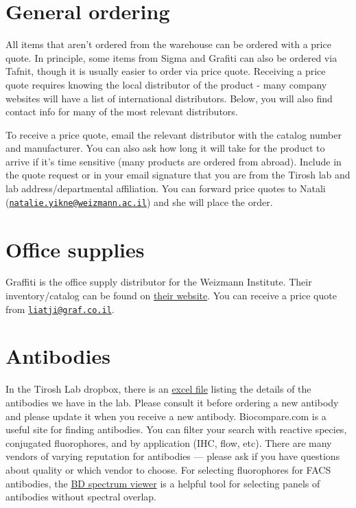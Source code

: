 \documentclass[]{book}
\begin{document}
\section{General ordering}\label{general-ordering}

All items that aren't ordered from the warehouse can be ordered with a
price quote. In principle, some items from Sigma and Grafiti can also be
ordered via Tafnit, though it is usually easier to order via price
quote. Receiving a price quote requires knowing the local distributor of
the product - many company websites will have a list of international
distributors. Below, you will also find contact info for many of the
most relevant distributors.

To receive a price quote, email the relevant distributor with the
catalog number and manufacturer. You can also ask how long it will take
for the product to arrive if it's time sensitive (many products are
ordered from abroad). Include in the quote request or in your email
signature that you are from the Tirosh lab and lab address/departmental
affiliation. You can forward price quotes to Natali
(\href{mailto:natalie.yikne@weizmann.ac.il}{\nolinkurl{natalie.yikne@weizmann.ac.il}})
and she will place the order.

\section{Office supplies}\label{office-supplies}

Graffiti is the office supply distributor for the Weizmann Institute.
Their inventory/catalog can be found on
\href{https://www.graffiti-online.co.il/}{their website}. You can
receive a price quote from
\href{mailto:liatji@graf.co.il}{\nolinkurl{liatji@graf.co.il}}.

\section{Antibodies}\label{antibodies}

In the Tirosh Lab dropbox, there is an
\href{https://www.dropbox.com/s/8fr2p795g5zgepz/antibodies_Tirosh.xlsx?dl=0}{excel
file} listing the details of the antibodies we have in the lab. Please
consult it before ordering a new antibody and please update it when you
receive a new antibody. Biocompare.com is a useful site for finding
antibodies. You can filter your search with reactive species, conjugated
fluorophores, and by application (IHC, flow, etc). There are many
vendors of varying reputation for antibodies --- please ask if you have
questions about quality or which vendor to choose. For selecting
fluorophores for FACS antibodies, the
\href{https://www.bdbiosciences.com/en-us/applications/research-applications/multicolor-flow-cytometry/product-selection-tools/spectrum-viewer}{BD
spectrum viewer} is a helpful tool for selecting panels of antibodies
without spectral overlap.
\end{document}

